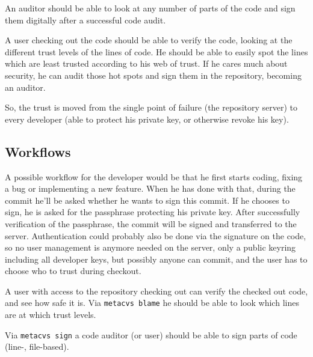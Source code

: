 \documentclass[fleqn, 10pt, a4paper]{article}
\begin{document}
An auditor should be able to look at any number of parts of the code
and sign them digitally after a successful code audit.

A user checking out the code should be able to verify the code, looking
at the different trust levels of the lines of code.
He should be able to easily spot the lines
which are least trusted according to his web of trust. If he cares much
about security, he can audit those hot spots and sign them in the repository,
becoming an auditor.

So, the trust is moved from the single point of failure (the repository
server) to every developer (able to protect his private key, or otherwise
revoke his key).

\subsection{Workflows}
A possible workflow for the developer would be that he first starts coding,
fixing a bug or implementing a new feature. When he has done with that,
during the commit he'll be asked whether he wants to sign this commit.
If he chooses to sign, he is asked for the passphrase protecting
his private key. After successfully verification of the passphrase,
the commit will be signed and transferred to the server.
Authentication could probably also be done via the signature on the code,
so no user management is anymore needed on the server, only a public keyring
including all developer keys, but possibly anyone can commit, and the user
has to choose who to trust during checkout.

A user with access to the repository checking out can verify the checked
out code, and see how safe it is.
Via \texttt{metacvs blame} he should be able to look which lines are
at which trust levels.

Via \texttt{metacvs sign} a code auditor (or user) should be able to
sign parts of code (line-, file-based).
\end{document}
